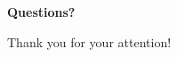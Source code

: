 \begin{frame}
    \begin{center}
        \vspace{4em}
        {\huge \textbf{Questions?}}
        
        \vspace{6em}
        {\Large Thank you for your attention!}
    \end{center}
\end{frame}